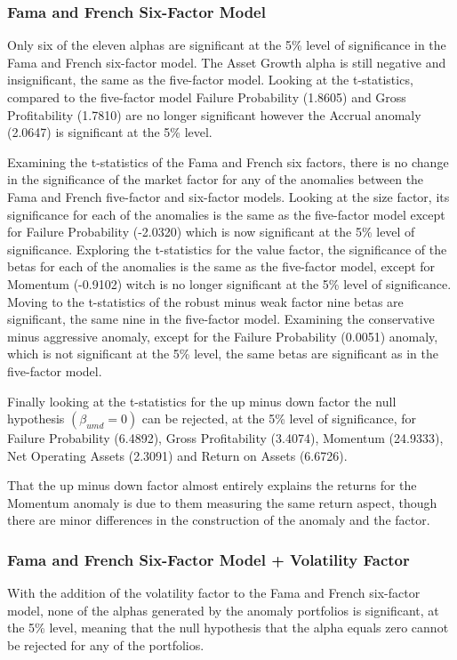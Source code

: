 \documentclass[a4paper,12pt]{article}                 %
\begin{document}
\subsubsection{Fama and French Six-Factor Model}
Only six of the eleven alphas are significant at the 5\% level of significance in the Fama and French six-factor model. The Asset Growth alpha is still negative and insignificant, the same as the five-factor model. Looking at the t-statistics, compared to the five-factor model Failure Probability (1.8605) and Gross Profitability (1.7810) are no longer significant however the Accrual anomaly (2.0647) is significant at the 5\% level.

Examining the t-statistics of the Fama and French six factors, there is no change in the significance of the market factor for any of the anomalies between the Fama and French five-factor and six-factor models. Looking at the size factor, its significance for each of the anomalies is the same as the five-factor model except for Failure Probability (-2.0320) which is now significant at the 5\% level of significance. Exploring the t-statistics for the value factor, the significance of the betas for each of the anomalies is the same as the five-factor model, except for Momentum (-0.9102) witch is no longer significant at the 5\% level of significance. Moving to the t-statistics of the robust minus weak factor nine betas are significant, the same nine in the five-factor model. Examining the conservative minus aggressive anomaly, except for the Failure Probability (0.0051) anomaly, which is not significant at the 5\% level, the same betas are significant as in the five-factor model.

Finally looking at the t-statistics for the up minus down factor the null hypothesis $(\beta_{umd}= 0)$ can be rejected, at the 5\% level of significance, for Failure Probability (6.4892), Gross Profitability (3.4074), Momentum (24.9333), Net Operating Assets (2.3091) and Return on Assets (6.6726).

That the up minus down factor almost entirely explains the returns for the Momentum anomaly is due to them measuring the same return aspect, though there are minor differences in the construction of the anomaly and the factor.

\subsubsection{Fama and French Six-Factor Model + Volatility Factor}
With the addition of the volatility factor to the Fama and French six-factor model, none of the alphas generated by the anomaly portfolios is significant, at the 5\% level, meaning that the null hypothesis that the alpha equals zero cannot be rejected for any of the portfolios. 
\end{document}

